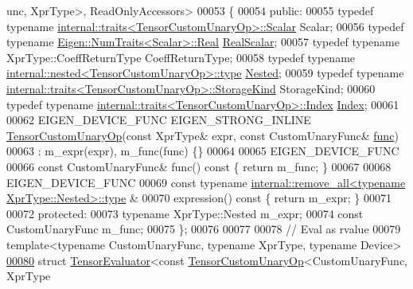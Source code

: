 \begin{DoxyCode}
      unc, XprType>, ReadOnlyAccessors>
00053 \{
00054   \textcolor{keyword}{public}:
00055   \textcolor{keyword}{typedef} \textcolor{keyword}{typename} \hyperlink{struct_eigen_1_1internal_1_1traits}{internal::traits<TensorCustomUnaryOp>::Scalar}
       Scalar;
00056   \textcolor{keyword}{typedef} \textcolor{keyword}{typename} \hyperlink{group___sparse_core___module}{Eigen::NumTraits<Scalar>::Real} 
      \hyperlink{group___sparse_core___module}{RealScalar};
00057   \textcolor{keyword}{typedef} \textcolor{keyword}{typename} XprType::CoeffReturnType CoeffReturnType;
00058   \textcolor{keyword}{typedef} \textcolor{keyword}{typename} \hyperlink{class_eigen_1_1internal_1_1_tensor_lazy_evaluator_writable}{internal::nested<TensorCustomUnaryOp>::type} 
      \hyperlink{class_eigen_1_1internal_1_1_tensor_lazy_evaluator_writable}{Nested};
00059   \textcolor{keyword}{typedef} \textcolor{keyword}{typename} \hyperlink{struct_eigen_1_1internal_1_1traits}{internal::traits<TensorCustomUnaryOp>::StorageKind}
       StorageKind;
00060   \textcolor{keyword}{typedef} \textcolor{keyword}{typename} \hyperlink{struct_eigen_1_1internal_1_1traits}{internal::traits<TensorCustomUnaryOp>::Index}
       \hyperlink{namespace_eigen_a62e77e0933482dafde8fe197d9a2cfde}{Index};
00061 
00062   EIGEN\_DEVICE\_FUNC EIGEN\_STRONG\_INLINE \hyperlink{class_eigen_1_1_tensor_custom_unary_op}{TensorCustomUnaryOp}(\textcolor{keyword}{const} XprType& expr, \textcolor{keyword}{const} 
      CustomUnaryFunc& \hyperlink{structfunc}{func})
00063       : m\_expr(expr), m\_func(func) \{\}
00064 
00065   EIGEN\_DEVICE\_FUNC
00066   \textcolor{keyword}{const} CustomUnaryFunc& func()\textcolor{keyword}{ const }\{ \textcolor{keywordflow}{return} m\_func; \}
00067 
00068   EIGEN\_DEVICE\_FUNC
00069   \textcolor{keyword}{const} \textcolor{keyword}{typename} \hyperlink{group___sparse_core___module}{internal::remove\_all<typename XprType::Nested>::type}
      &
00070   expression()\textcolor{keyword}{ const }\{ \textcolor{keywordflow}{return} m\_expr; \}
00071 
00072   \textcolor{keyword}{protected}:
00073     \textcolor{keyword}{typename} XprType::Nested m\_expr;
00074     \textcolor{keyword}{const} CustomUnaryFunc m\_func;
00075 \};
00076 
00077 
00078 \textcolor{comment}{// Eval as rvalue}
00079 \textcolor{keyword}{template}<\textcolor{keyword}{typename} CustomUnaryFunc, \textcolor{keyword}{typename} XprType, \textcolor{keyword}{typename} Device>
\hyperlink{struct_eigen_1_1_tensor_evaluator_3_01const_01_tensor_custom_unary_op_3_01_custom_unary_func_00_c98bd2331846ae9855eae47ba436125b}{00080} \textcolor{keyword}{struct }\hyperlink{struct_eigen_1_1_tensor_evaluator}{TensorEvaluator}<const \hyperlink{class_eigen_1_1_tensor_custom_unary_op}{TensorCustomUnaryOp}<CustomUnaryFunc, XprType

\end{DoxyCode}

